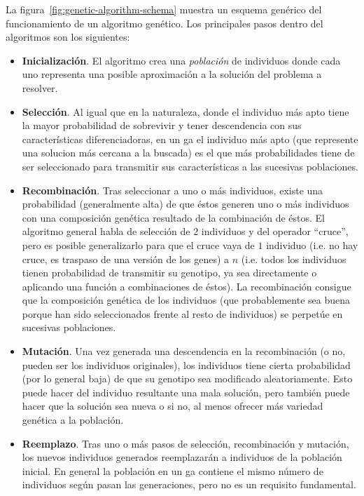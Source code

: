 La figura~\ref{fig:genetic-algorithm-schema} muestra un esquema genérico del funcionamiento de un algoritmo genético. Los principales pasos dentro del algoritmos son los siguientes:

\begin{itemize}
	\item \textbf{Inicialización}. El algoritmo crea una \textit{población} de individuos donde cada uno representa una posible aproximación a la solución del problema a resolver.
	\item \textbf{Selección}. Al igual que en la naturaleza, donde el individuo más apto tiene la mayor probabilidad de sobrevivir y tener descendencia con sus características diferenciadoras, en un \gls{ga} el individuo más apto (que represente una solucion más cercana a la buscada) es el que más probabilidades tiene de ser seleccionado para transmitir sus características a las sucesivas poblaciones.
	\item \textbf{Recombinación}. Tras seleccionar a uno o más individuos, existe una probabilidad (generalmente alta) de que éstos generen uno o más individuos con una composición genética resultado de la combinación de éstos. El algoritmo general habla de selección de $2$ individuos y del operador \enquote{cruce}, pero es posible generalizarlo para que el cruce vaya de $1$ individuo (i.e. no hay cruce, es traspaso de una versión de los genes) a $n$ (i.e. todos los individuos tienen probabilidad de transmitir su genotipo, ya sea directamente o aplicando una función a combinaciones de éstos). La recombinación consigue que la composición genética de los individuos (que probablemente sea buena porque han sido seleccionados frente al resto de individuos) se perpetúe en sucesivas poblaciones.
	\item \textbf{Mutación}. Una vez generada una descendencia en la recombinación (o no, pueden ser los individuos originales), los individuos tiene cierta probabilidad (por lo general baja) de que su genotipo sea modificado aleatoriamente. Esto puede hacer del individuo resultante una mala solución, pero también puede hacer que la solución sea nueva o si no, al menos ofrecer más variedad genética a la población.
	\item \textbf{Reemplazo}. Tras uno o más pasos de selección, recombinación y mutación, los nuevos individuos generados reemplazarán a individuos de la población inicial. En general la población en un \gls{ga} contiene el mismo número de individuos según pasan las generaciones, pero no es un requisito fundamental.
\end{itemize}

